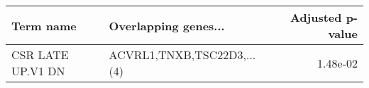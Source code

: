 \begin{tabular}{llr}
\toprule
        Term name &       Overlapping genes... &  Adjusted p-value \\
\midrule
CSR LATE UP.V1 DN & ACVRL1,TNXB,TSC22D3,...(4) &          1.48e-02 \\
\bottomrule
\end{tabular}

